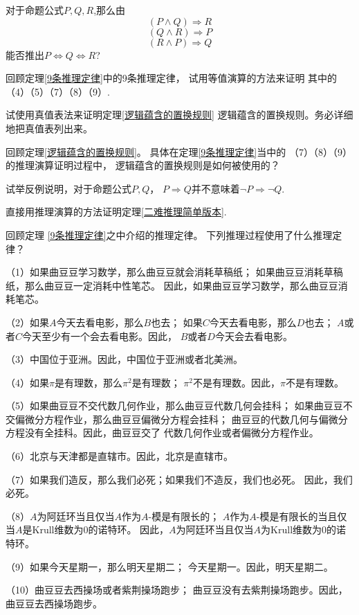 \begin{prob}对于命题公式$P,Q,R$,那么由
$$(P\wedge Q)\Rightarrow R$$
$$(Q\wedge R)\Rightarrow P$$
$$(R\wedge P)\Rightarrow Q$$
能否推出$P\Leftrightarrow Q\Leftrightarrow R$?
\end{prob}\vs

\begin{prob}[基本推理定律的验证]
回顾定理\ref{9条推理定律}中的9条推理定律，
试用等值演算的方法来证明
其中的（4）（5）（7）（8）（9）.
\end{prob}\vs

\begin{prob}[真值表法的尝试]
试使用真值表法来证明定理\ref{逻辑蕴含的置换规则}
逻辑蕴含的置换规则。务必详细地把真值表列出来。
\end{prob}\vs

\begin{prob}[逻辑蕴含的置换规则的使用]
回顾定理\ref{逻辑蕴含的置换规则}。
具体在定理\ref{9条推理定律}当中的
（7）（8）（9）的推理演算证明过程中，
逻辑蕴含的置换规则是如何被使用的？
\end{prob}\vs

\begin{prob}试举反例说明，对于命题公式$P,Q$，
$P\Rightarrow Q$并不意味着$\neg P\Rightarrow \neg Q$.
\end{prob}\vs

\begin{prob}[二难推理简单版本]
直接用推理演算的方法证明定理\ref{二难推理简单版本}.
\end{prob}\vs

\begin{prob}[推理定律的日常使用]回顾定理
\ref{9条推理定律}之中介绍的推理定律。
下列推理过程使用了什么推理定律？

（1）如果曲豆豆学习数学，那么曲豆豆就会消耗草稿纸；
如果曲豆豆消耗草稿纸，那么曲豆豆一定消耗中性笔芯。
因此，如果曲豆豆学习数学，那么曲豆豆消耗笔芯。

（2）如果$A$今天去看电影，那么$B$也去；
如果$C$今天去看电影，那么$D$也去；
$A$或者$C$今天至少有一个会去看电影。因此，
$B$或者$D$今天会去看电影。

（3）中国位于亚洲。因此，中国位于亚洲或者北美洲。

（4）如果$\pi$是有理数，那么$\pi^2$是有理数；
$\pi^2$不是有理数。因此，$\pi$不是有理数。

（5）如果曲豆豆不交代数几何作业，那么曲豆豆代数几何会挂科；
如果曲豆豆不交偏微分方程作业，那么曲豆豆偏微分方程会挂科；
曲豆豆的代数几何与偏微分方程没有全挂科。因此，曲豆豆交了
代数几何作业或者偏微分方程作业。

（6）北京与天津都是直辖市。因此，北京是直辖市。

（7）如果我们造反，那么我们必死；如果我们不造反，我们也必死。
因此，我们必死。

（8）$A$为阿廷环当且仅当$A$作为$A$-模是有限长的；
$A$作为$A$-模是有限长的当且仅当$A$是Krull维数为0的诺特环。
因此，$A$为阿廷环当且仅当$A$为Krull维数为0的诺特环。

（9）如果今天星期一，那么明天星期二；
今天星期一。因此，明天星期二。

（10）曲豆豆去西操场或者紫荆操场跑步；
曲豆豆没有去紫荆操场跑步。因此，曲豆豆去西操场跑步。
\end{prob}\vs

